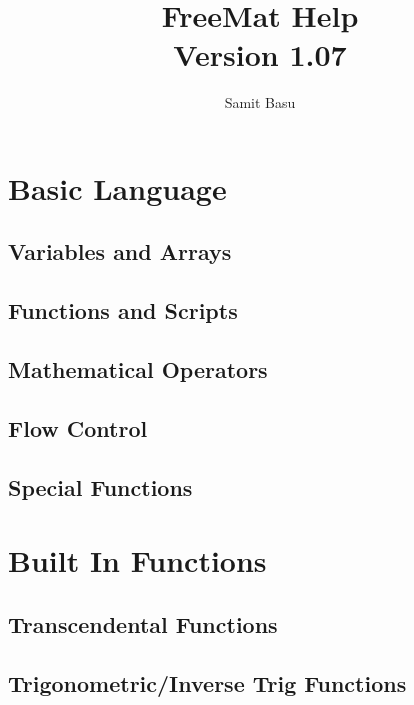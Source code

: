 \documentclass{book}
\title{FreeMat Help\\Version 1.07}
\author{Samit Basu}
\begin{document}
\maketitle
\tableofcontents
\chapter{Basic Language}
\section{Variables and Arrays}






\section{Functions and Scripts}








\section{Mathematical Operators}















\section{Flow Control}












\section{Special Functions}








\chapter{Built In Functions}
\section{Transcendental Functions}


\section{Trigonometric/Inverse Trig Functions}










\end{document}
